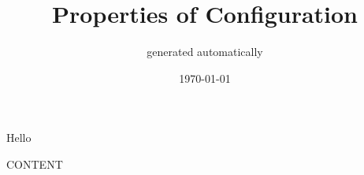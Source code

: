 \documentclass[12pt]{article}
\title{Properties of Configuration}
\author{generated automatically}
\date{\today}
\begin{document}
\maketitle
\thispagestyle{empty}

Hello

\newpage

CONTENT
\end{document}

